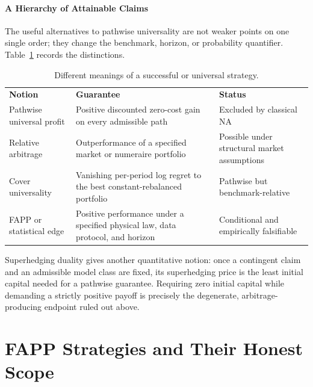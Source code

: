 \documentclass[aps,pra,reprint,superscriptaddress,amsmath,amssymb,floatfix]{revtex4-2}
\theoremstyle{plain}
\theoremstyle{definition}
\theoremstyle{remark}
\begin{document}
\paragraph{A Hierarchy of Attainable Claims}

The useful alternatives to pathwise universality are not weaker points on one
single order; they change the benchmark, horizon, or probability quantifier.
Table~\ref{tab:hierarchy} records the distinctions.

\begin{table}[ht]
\caption{\label{tab:hierarchy}Different meanings of a successful or universal strategy.}
\centering
\begin{ruledtabular}
\begin{tabular}{p{}p{}p{}}
\textbf{Notion} & \textbf{Guarantee} & \textbf{Status} \\
\colrule
Pathwise universal profit
& Positive discounted zero-cost gain on every admissible path
& Excluded by classical NA \\
Relative arbitrage
& Outperformance of a specified market or numeraire portfolio
& Possible under structural market assumptions \\
Cover universality
& Vanishing per-period log regret to the best constant-rebalanced portfolio
& Pathwise but benchmark-relative \\
FAPP or statistical edge
& Positive performance under a specified physical law, data protocol, and horizon
& Conditional and empirically falsifiable \\
\end{tabular}
\end{ruledtabular}
\end{table}

Superhedging duality gives another quantitative notion: once a contingent
claim and an admissible model class are fixed, its superhedging price is the
least initial capital needed for a pathwise guarantee. Requiring zero initial
capital while demanding a strictly positive payoff is precisely the
degenerate, arbitrage-producing endpoint ruled out above.

\section{FAPP Strategies and Their Honest Scope}
\label{sec:fapp}
\end{document}
